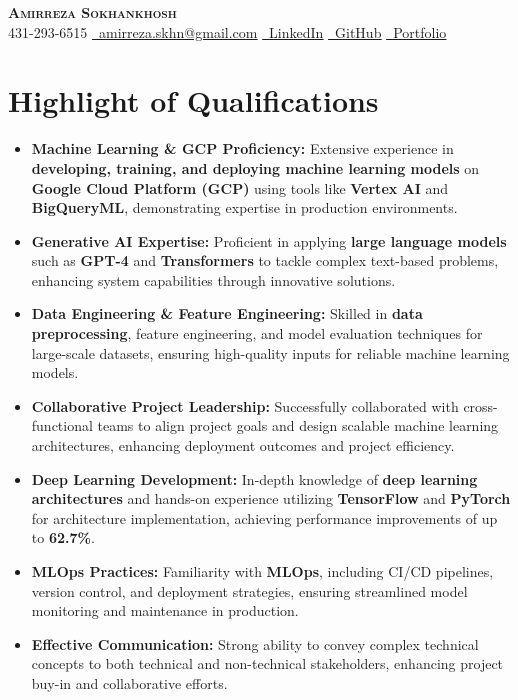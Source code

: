 \documentclass[letterpaper,11pt]{article}
\newcommand{\resumeItem}[1]{
  \item\small{
    #1 \vspace{0pt}
  }
}
\newcommand{\resumeItemListStart}{\begin{itemize}}
\newcommand{\resumeItemListEnd}{\end{itemize}\vspace{-5pt}}
\begin{document}


\begin{center}
    \textbf{\Huge \scshape Amirreza Sokhankhosh} \\ \vspace{1pt}
    \faPhone \small 431-293-6515 \quad
    \href{mailto:amirreza.skhn@gmail.com}{\faEnvelope \ \underline{amirreza.skhn@gmail.com}} \quad
    \href{https://www.linkedin.com/in/amirrezakh/}{\faLinkedin \ \underline{LinkedIn}} \quad
    \href{https://github.com/amirrezaskh}{\faGithub \ \underline{GitHub}} \quad
    \href{https://amirrezaskh.com}{\faBriefcase \ \underline{Portfolio}}
\end{center}

\section{Highlight of Qualifications}
\resumeItemListStart
\resumeItem{\textbf{Machine Learning \& GCP Proficiency:} Extensive experience in \textbf{developing, training, and deploying machine learning models} on \textbf{Google Cloud Platform (GCP)} using tools like \textbf{Vertex AI} and \textbf{BigQueryML}, demonstrating expertise in production environments.}
\resumeItem{\textbf{Generative AI Expertise:} Proficient in applying \textbf{large language models} such as \textbf{GPT-4} and \textbf{Transformers} to tackle complex text-based problems, enhancing system capabilities through innovative solutions.}
\resumeItem{\textbf{Data Engineering \& Feature Engineering:} Skilled in \textbf{data preprocessing}, feature engineering, and model evaluation techniques for large-scale datasets, ensuring high-quality inputs for reliable machine learning models.}
\resumeItem{\textbf{Collaborative Project Leadership:} Successfully collaborated with cross-functional teams to align project goals and design scalable machine learning architectures, enhancing deployment outcomes and project efficiency.}
\resumeItem{\textbf{Deep Learning Development:} In-depth knowledge of \textbf{deep learning architectures} and hands-on experience utilizing \textbf{TensorFlow} and \textbf{PyTorch} for architecture implementation, achieving performance improvements of up to \textbf{62.7\%}.}
\resumeItem{\textbf{MLOps Practices:} Familiarity with \textbf{MLOps}, including CI/CD pipelines, version control, and deployment strategies, ensuring streamlined model monitoring and maintenance in production.}
\resumeItem{\textbf{Effective Communication:} Strong ability to convey complex technical concepts to both technical and non-technical stakeholders, enhancing project buy-in and collaborative efforts.}
\resumeItemListEnd
\end{document}
